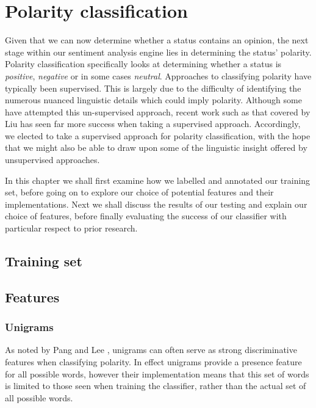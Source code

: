 \chapter{Polarity classification}
\label{polarity}

Given that we can now determine whether a status contains an opinion, the next stage within our sentiment analysis engine lies in determining the status' polarity. Polarity classification specifically looks at determining whether a status is \emph{positive}, \emph{negative} or in some cases \emph{neutral}. Approaches to classifying polarity have typically been supervised. This is largely due to the difficulty of identifying the numerous nuanced linguistic details which could imply polarity. Although some \cite{Turney:2002vv} have attempted this un-supervised approach, recent work such as that covered by Liu \cite{Liu:2010tm} has seen far more success when taking a supervised approach. Accordingly, we elected to take a supervised approach for polarity classification, with the hope that we might also be able to draw upon some of the linguistic insight offered by unsupervised approaches.

In this chapter we shall first examine how we labelled and annotated our training set, before going on to explore our choice of potential features and their implementations. Next we shall discuss the results of our testing and explain our choice of features, before finally evaluating the success of our classifier with particular respect to prior research.


\section{Training set}

\section{Features}

\subsection{Unigrams}

As noted by Pang and Lee \cite{Pang:2002tu}, unigrams can often serve as strong discriminative features when classifying polarity. In effect unigrams provide a presence feature for all possible words, however their implementation means that this set of words is limited to those seen when training the classifier, rather than the actual set of all possible words.

